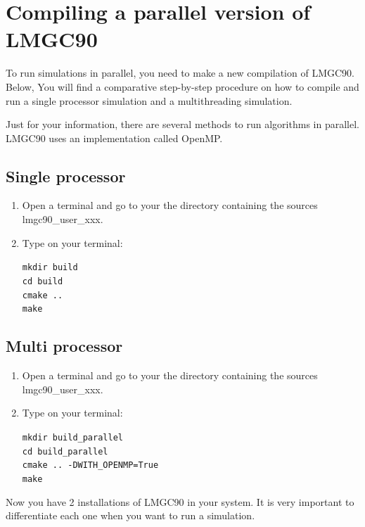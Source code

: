 \documentclass[12pt]{article}
\begin{document}
\section*{Compiling a parallel version of LMGC90}
To run simulations in parallel, you need to make a new compilation of LMGC90. Below, You will find a comparative step-by-step procedure on how to compile and run a single processor simulation and a multithreading simulation. 

Just for your information, there are several methods to run algorithms in parallel. LMGC90 uses an implementation called OpenMP.

\subsection*{Single processor}
\begin{enumerate}
  \item Open a terminal and go to your the directory containing the sources lmgc90\_user\_xxx.
  \item Type on your terminal:
  \begin{tcolorbox}
  \texttt{mkdir build} \\
  \texttt{cd build} \\
  \texttt{cmake ..} \\
  \texttt{make}
  \end{tcolorbox}
\end{enumerate}

\subsection*{Multi processor}
\begin{enumerate}
  \item Open a terminal and go to your the directory containing the sources lmgc90\_user\_xxx.
  \item Type on your terminal:
  \begin{tcolorbox}
  \texttt{mkdir build\_parallel} \\
  \texttt{cd build\_parallel} \\
  \texttt{cmake .. -DWITH\_OPENMP=True} \\
  \texttt{make}
  \end{tcolorbox}
\end{enumerate}

Now you have 2 installations of LMGC90 in your system. 
It is very important to differentiate each one when you want to run a simulation. 
\end{document}
